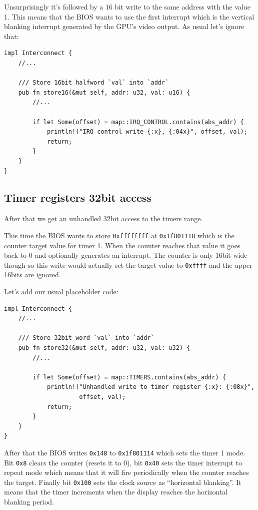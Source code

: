 \documentclass[a4paper]{article}
\newcommand{\code}[1] {\texttt{#1}}
\begin{document}
Unsurprisingly it's followed by a 16 bit write to the same address
with the value 1. This means that the BIOS wants to use the first
interrupt which is the vertical blanking interrupt generated by the
GPU's video output. As usual let's ignore that:

\begin{lstlisting}
impl Interconnect {
    //...

    /// Store 16bit halfword `val` into `addr`
    pub fn store16(&mut self, addr: u32, val: u16) {
        //...

        if let Some(offset) = map::IRQ_CONTROL.contains(abs_addr) {
            println!("IRQ control write {:x}, {:04x}", offset, val);
            return;
        }
    }
}
\end{lstlisting}

\subsection{Timer registers 32bit access}

After that we get an unhandled 32bit access to the timers range.

This time the BIOS wants to store \code{0xffffffff} at
\code{0x1f801118} which is the counter target value for timer 1. When
the counter reaches that value it goes back to 0 and optionally
generates an interrupt. The counter is only 16bit wide though so this
write would actually set the target value to \code{0xffff} and the
upper 16bits are ignored.

Let's add our usual placeholder code:

\begin{lstlisting}
impl Interconnect {
    //...

    /// Store 32bit word `val` into `addr`
    pub fn store32(&mut self, addr: u32, val: u32) {
        //...

        if let Some(offset) = map::TIMERS.contains(abs_addr) {
            println!("Unhandled write to timer register {:x}: {:08x}",
                     offset, val);
            return;
        }
    }
}
\end{lstlisting}

After that the BIOS writes \code{0x148} to \code{0x1f801114} which
sets the timer 1 mode. Bit \code{0x8} clears the counter (resets it to
0), bit \code{0x40} sets the timer interrupt to repeat mode which
means that it will fire periodically when the counter reaches the
target. Finally bit \code{0x100} sets the clock source as ``horizontal
blanking''. It means that the timer increments when the display
reaches the horizontal blanking period.
\end{document}

